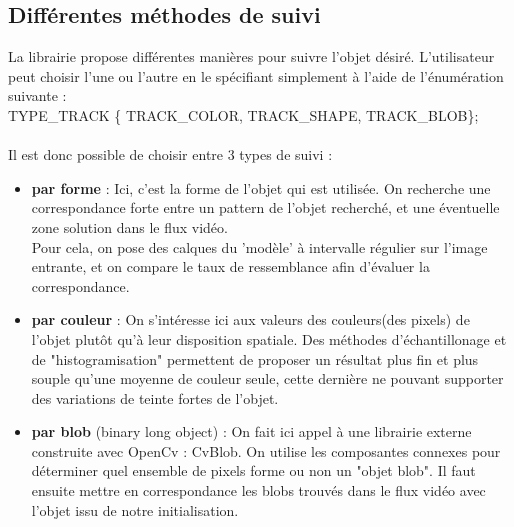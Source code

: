 \documentclass{article}
\begin{document}
\subsection{Différentes méthodes de suivi}
La librairie propose différentes manières pour suivre l'objet désiré. L'utilisateur peut choisir l'une ou l'autre en le spécifiant simplement à l'aide de l'énumération suivante :\\
TYPE\_TRACK \{ TRACK\_COLOR, TRACK\_SHAPE, TRACK\_BLOB\};
\paragraph{}
Il est donc possible de choisir entre 3 types de suivi : \\
\begin{itemize}
\item {\textbf{par forme} : } Ici, c'est la forme de l'objet qui est utilisée. On recherche une correspondance forte entre un pattern de l'objet recherché, et une éventuelle zone solution dans le flux vidéo. \\
Pour cela, on pose des calques du 'modèle' à intervalle régulier sur l'image entrante, et on compare le taux de ressemblance afin d'évaluer la correspondance.\\
\item {\textbf{par couleur} : } On s'intéresse ici aux valeurs des couleurs(des pixels) de l'objet plutôt qu'à leur disposition spatiale. Des méthodes d'échantillonage et de "histogramisation" permettent de proposer un résultat plus fin et plus souple qu'une moyenne de couleur seule, cette dernière ne pouvant supporter des variations de teinte fortes de l'objet.\\
\item {\textbf{par blob} (binary long object) : } On fait ici appel à une librairie externe construite avec OpenCv : CvBlob. On utilise les composantes connexes pour déterminer quel ensemble de pixels forme ou non un "objet blob". Il faut ensuite mettre en correspondance les blobs trouvés dans le flux vidéo avec l'objet issu de notre initialisation.
\end{itemize}
\end{document}
